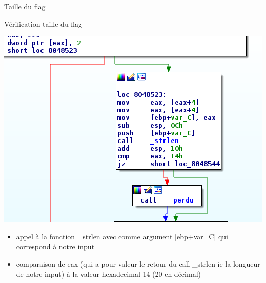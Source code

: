 \documentclass[10pt,sans,usenames,dvipsnames,french,compress]{beamer}
\begin{document}
\begin{frame}[fragile]{Taille du flag}
\begin{block}{Vérification taille du flag}
	  \begin{center}
			\includegraphics[width=0.5\linewidth]{114/lenght.png}
			
		\end{center}
		\end{block}
	\begin{exampleblock}{}
		\begin{itemize}
			  
		\item appel à la fonction \_strlen avec comme argument [ebp+var\_C] qui correspond à notre input
		\item comparaison de eax (qui a pour valeur le retour du call \_strlen ie la longueur de notre input) à la valeur hexadecimal 14 (20 en décimal)
			\end{itemize}
\end{exampleblock}

\end{frame}	
\end{document}
